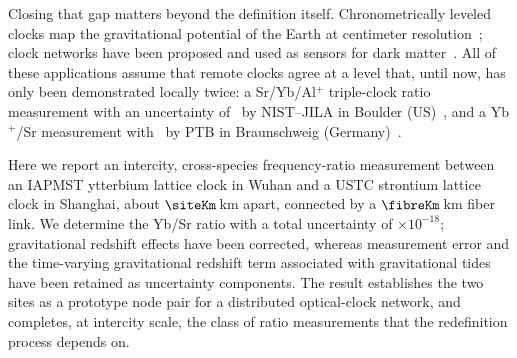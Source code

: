 Closing that gap matters beyond the definition itself. Chronometrically
leveled clocks map the gravitational potential of the Earth at
centimeter resolution~\citep{grotti2018geodesy, takamoto2020redshift,
mcgrew2018geodesy}; clock networks have been proposed and used as
sensors for dark matter~\citep{derevianko2014topological,
wcislo2018global}. All of these applications assume that remote clocks
agree at a level that, until now, has only been demonstrated locally
twice: a Sr/Yb/Al$^+$ triple-clock ratio measurement with an uncertainty
of ~by NIST--JILA in Boulder (US)~\citep{aeppli2026nist},
and a Yb$^+$/Sr measurement with ~by PTB in
Braunschweig (Germany)~\citep{vishwakarma2026interspeciesclockcomparison5}.

Here we report an intercity, cross-species frequency-ratio measurement
between an IAPMST ytterbium lattice clock in Wuhan and a USTC strontium
lattice clock in Shanghai, about $\siteKm$\,km apart, connected by a
$\fibreKm$\,km fiber link. We determine the Yb/Sr ratio with a total
uncertainty of \uTotalShort$\times10^{-18}$; gravitational redshift
effects have been corrected, whereas measurement error and the
time-varying gravitational redshift term associated with gravitational
tides have been retained as uncertainty components. The result
establishes the two sites as a prototype node pair for a distributed
optical-clock network, and completes, at intercity scale, the class of
ratio measurements that the redefinition process depends on.
